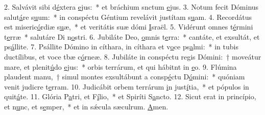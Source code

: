 2. Salvávit sibi d\uline{é}xtera \uline{e}jus:~* et bráchium snctum \uline{e}jus.
3. Notum fecit Dóminus salut\uline{á}re s\uline{u}um:~* in conspéctu Géntium revelávit justítam s\uline{u}am.
4. Recordátus est miseric\uline{ó}rdiæ s\uline{u}æ,~* et veritátis suæ dómi \uline{I}sraël.
5. Vidérunt omnes t\uline{é}rmini t\uline{e}rræ~* salutáre Di n\uline{o}stri.
6. Jubiláte Deo, \uline{o}mnis t\uline{e}rra:~* cantáte, et exsultát, et ps\uline{á}llite.
7. Psállite Dómino in cíthara, in cíthara et v\uline{o}ce ps\uline{a}lmi:~* in tubis ductílibus, et voce tbæ c\uline{ó}rneæ.
8. Jubiláte in conspéctu regis Dómini:~† moveátur mare, et plenit\uline{ú}do \uline{e}jus:~* orbis terrárum, et qui hábitnt in \uline{e}o.
9. Flúmina plaudent manu,~† simul montes exsultábunt a consp\uline{é}ctu D\uline{ó}mini:~* quóniam venit judicre t\uline{e}rram.
10. Judicábit orbem terrárum \uline{i}n just\uline{í}tia,~* et pópulos in quit\uline{á}te.
11. Glória P\uline{a}tri, et F\uline{í}lio,~* et Spiríti S\uline{a}ncto.
12. Sicut erat in princípio, et n\uline{u}nc, et s\uline{e}mper,~* et in sǽcula sæculrum. \uline{A}men.
